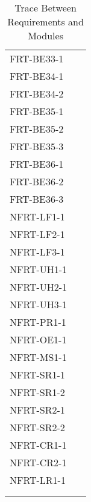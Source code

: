 \documentclass[12pt, titlepage]{article}
\begin{document}
\begin{longtable}{p{} p{}}
	FRT-BE33-1            & ~                \\
	FRT-BE34-1            & ~                \\
	FRT-BE34-2            & ~                \\
	FRT-BE35-1            & ~                \\
	FRT-BE35-2            & ~                \\
	FRT-BE35-3            & ~                \\
	FRT-BE36-1            & ~                \\
	FRT-BE36-2            & ~                \\
	FRT-BE36-3            & ~                \\
	NFRT-LF1-1            & ~                \\
	NFRT-LF2-1            & ~                \\
	NFRT-LF3-1            & ~                \\
	NFRT-UH1-1            & ~                \\
	NFRT-UH2-1            & ~                \\
	NFRT-UH3-1            & ~                \\
	NFRT-PR1-1            & ~                \\
	NFRT-OE1-1            & ~                \\
	NFRT-MS1-1            & ~                \\
	NFRT-SR1-1            & ~                \\
	NFRT-SR1-2            & ~                \\
	NFRT-SR2-1            & ~                \\
	NFRT-SR2-2            & ~                \\
	NFRT-CR1-1            & ~                \\
	NFRT-CR2-1            & ~                \\
	NFRT-LR1-1            & ~                \\
	\bottomrule
	\\
	\caption{Trace Between Requirements and Modules}
	\label{TblRT}                            \\
\end{longtable}
\end{document}
